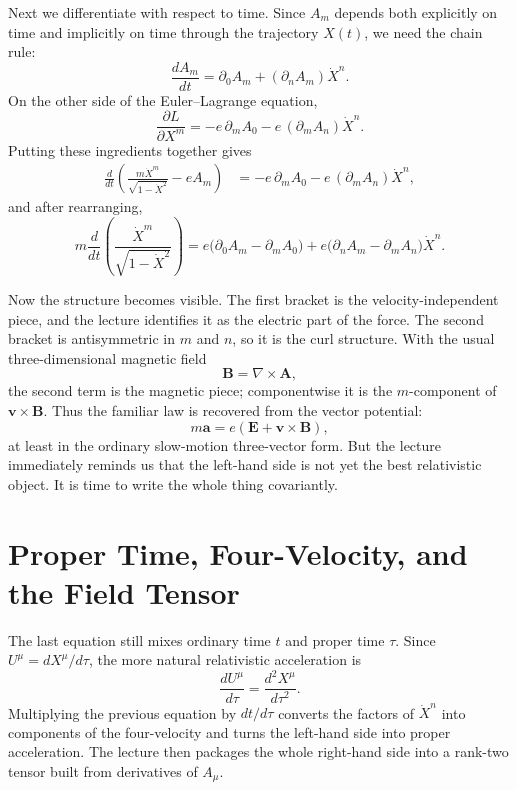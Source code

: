 Next we differentiate with respect to time. Since \(A_m\) depends both explicitly on time and implicitly on time through the trajectory \(X(t)\), we need the chain rule:
\begin{equation}
\frac{dA_m}{dt} = \partial_0 A_m + (\partial_n A_m)\dot X^n.
\end{equation}
On the other side of the Euler--Lagrange equation,
\begin{equation}
\frac{\partial L}{\partial X^m}
=
-e\,\partial_m A_0
-e\,(\partial_m A_n)\dot X^n.
\end{equation}
Putting these ingredients together gives
\begin{align}
\frac{d}{dt}\left(\frac{m\dot X^m}{\sqrt{1-\dot X^2}}-eA_m\right)
&=
-e\,\partial_m A_0
-e\,(\partial_m A_n)\dot X^n,
\end{align}
and after rearranging,
\begin{equation}
m\frac{d}{dt}\left(\frac{\dot X^m}{\sqrt{1-\dot X^2}}\right)
=
e\bigl(\partial_0A_m-\partial_mA_0\bigr)
+
e\bigl(\partial_nA_m-\partial_mA_n\bigr)\dot X^n.
\end{equation}

Now the structure becomes visible. The first bracket is the velocity-independent piece, and the lecture identifies it as the electric part of the force. The second bracket is antisymmetric in \(m\) and \(n\), so it is the curl structure. With the usual three-dimensional magnetic field
\begin{equation}
\mathbf B = \nabla\times \mathbf A,
\end{equation}
the second term is the magnetic piece; componentwise it is the \(m\)-component of \(\mathbf v\times \mathbf B\). Thus the familiar law is recovered from the vector potential:
\begin{equation}
m\mathbf a = e\left(\mathbf E+\mathbf v\times\mathbf B\right),
\end{equation}
at least in the ordinary slow-motion three-vector form. But the lecture immediately reminds us that the left-hand side is not yet the best relativistic object. It is time to write the whole thing covariantly.

\section{Proper Time, Four-Velocity, and the Field Tensor}

The last equation still mixes ordinary time \(t\) and proper time \(\tau\). Since \(U^\mu=dX^\mu/d\tau\), the more natural relativistic acceleration is
\begin{equation}
\frac{dU^\mu}{d\tau}
=
\frac{d^2X^\mu}{d\tau^2}.
\end{equation}
Multiplying the previous equation by \(dt/d\tau\) converts the factors of \(\dot X^n\) into components of the four-velocity and turns the left-hand side into proper acceleration. The lecture then packages the whole right-hand side into a rank-two tensor built from derivatives of \(A_\mu\).

